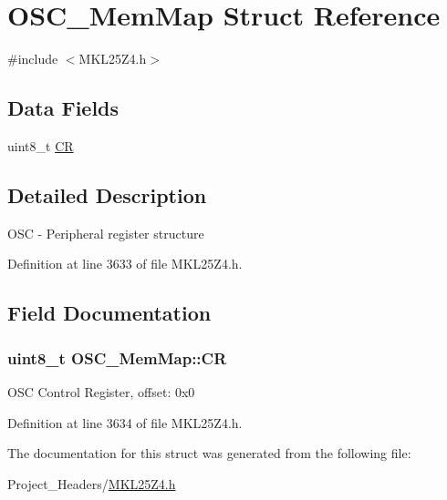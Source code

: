 \hypertarget{struct_o_s_c___mem_map}{}\section{O\+S\+C\+\_\+\+Mem\+Map Struct Reference}
\label{struct_o_s_c___mem_map}


{\ttfamily \#include $<$M\+K\+L25\+Z4.\+h$>$}

\subsection*{Data Fields}
\begin{DoxyCompactItemize}
\item 
uint8\+\_\+t \hyperlink{struct_o_s_c___mem_map_adb3c443099915a22c9951ff23c8eaa16}{CR}
\end{DoxyCompactItemize}


\subsection{Detailed Description}
O\+SC -\/ Peripheral register structure 

Definition at line 3633 of file M\+K\+L25\+Z4.\+h.



\subsection{Field Documentation}
\subsubsection[{\texorpdfstring{CR}{CR}}]{\setlength{\rightskip}{0pt plus 5cm}uint8\+\_\+t O\+S\+C\+\_\+\+Mem\+Map\+::\+CR}\hypertarget{struct_o_s_c___mem_map_adb3c443099915a22c9951ff23c8eaa16}{}\label{struct_o_s_c___mem_map_adb3c443099915a22c9951ff23c8eaa16}
O\+SC Control Register, offset\+: 0x0 

Definition at line 3634 of file M\+K\+L25\+Z4.\+h.



The documentation for this struct was generated from the following file\+:\begin{DoxyCompactItemize}
\item 
Project\+\_\+\+Headers/\hyperlink{_m_k_l25_z4_8h}{M\+K\+L25\+Z4.\+h}\end{DoxyCompactItemize}
